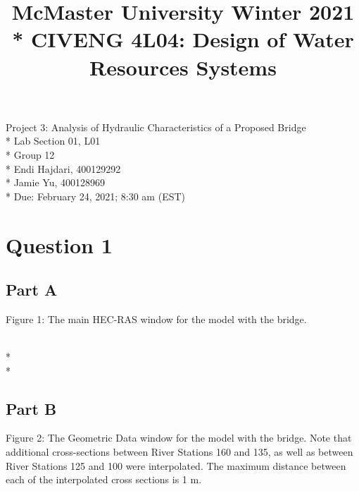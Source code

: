 \documentclass[]{article}
\title{\large{McMaster University Winter 2021} \LARGE \\* CIVENG 4L04: Design of Water Resources Systems}
\date{}
\begin{document}
\maketitle
\thispagestyle{empty}
\begin{center}
	\vspace{3.6cm}
	\Huge Project 3: Analysis of Hydraulic Characteristics of a Proposed Bridge \\* \vspace{1cm}
	\Large Lab Section 01, L01 \\* \vspace{1cm}
	\Large Group 12 \\* \vspace{0.25cm}
	\large Endi Hajdari, 400129292 \\* \vspace{0.05cm}
	Jamie Yu, 400128969 \\* \vspace{6cm}
	\large Due: February 24, 2021; 8:30 am (EST) 
\end{center}	
\newpage
\doublespacing
\tableofcontents
\singlespacing
\newpage 
\section{Question 1}
\subsection{Part A}
 \begin{minipage}[t]{\linewidth}
	\raggedright
	
	\medskip
	\begin{center} 
		Figure 1: The main HEC-RAS window for the model with the bridge.
	\end{center}
\end{minipage} \\* \\*
\subsection{Part B}
 \begin{minipage}[t]{\linewidth}
	\raggedright
	
	\medskip
	\begin{center} 
		Figure 2: The Geometric Data window for the model with the bridge. Note that additional cross-sections between River Stations 160 and 135, as well as between River Stations 125 and 100 were interpolated. The maximum distance between each of the interpolated cross sections is 1 m.
	\end{center}
\end{minipage}
\newpage
\end{document}
